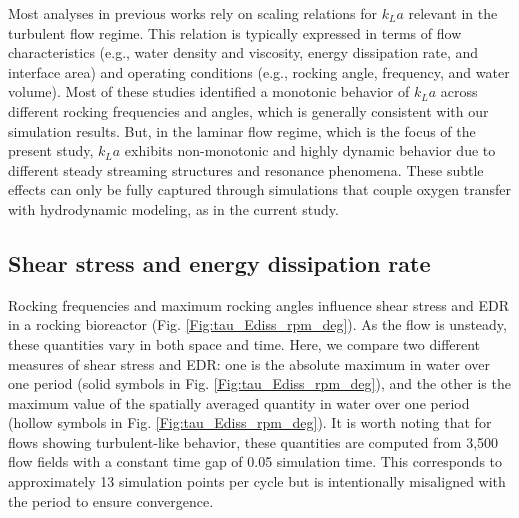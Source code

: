 \documentclass[final,3p,times,twocolumn,authoryear]{elsarticle}
\theoremstyle{definition}
\begin{document}
Most analyses in previous works rely on scaling relations for $k_La$ relevant in the turbulent flow regime. This relation is typically expressed in terms of flow characteristics (e.g., water density and viscosity, energy dissipation rate, and interface area) and operating conditions (e.g., rocking angle, frequency, and water volume). Most of these studies identified a monotonic behavior of $k_La$ across different rocking frequencies and angles, which is generally consistent with our simulation results. But, in the laminar flow regime, which is the focus of the present study, $k_La$ exhibits non-monotonic and highly dynamic behavior due to different steady streaming structures and resonance phenomena. These subtle effects can only be fully captured through simulations that couple oxygen transfer with hydrodynamic modeling, as in the current study.


\subsection{Shear stress and energy dissipation rate} \label{subsec:results-shear}

Rocking frequencies and maximum rocking angles influence shear stress and EDR in a rocking bioreactor (Fig. \ref{Fig:tau_Ediss_rpm_deg}). As the flow is unsteady, these quantities vary in both space and time.  Here, we compare two different measures of shear stress and EDR: one is the absolute maximum in water over one period (solid symbols in Fig. \ref{Fig:tau_Ediss_rpm_deg}), and the other is the maximum value of the spatially averaged quantity in water over one period (hollow symbols in Fig. \ref{Fig:tau_Ediss_rpm_deg}). It is worth noting that for flows showing turbulent-like behavior, these quantities are computed from 3,500 flow fields with a constant time gap of 0.05 simulation time. This corresponds to approximately 13 simulation points per cycle but is intentionally misaligned with the period to ensure convergence.
\end{document}
